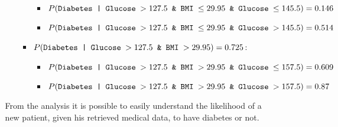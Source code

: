 \documentclass[12pt]{article}
\begin{document}
\begin{enumerate}[leftmargin=\labelsep, label=\textbf{\arabic*.)}]
\begin{enumerate}[label=\textbf{\roman*.)},leftmargin=0em]
\begin{itemize}
\begin{itemize}
                                        \begin{itemize}
                                            \item $P( \text{\texttt{Diabetes | Glucose $> 127.5$ \& BMI $\leq 29.95$ \& Glucose $\leq 145.5$}}) = 0.146$
                                            \item $P( \text{\texttt{Diabetes | Glucose $> 127.5$ \& BMI $\leq 29.95$ \& Glucose $> 145.5$}}) = 0.514$
                                        \end{itemize}
                                  \item $P( \text{\texttt{Diabetes | Glucose $> 127.5$ \& BMI $> 29.95$}}) = 0.725$:
                                        \begin{itemize}
                                            \item $P( \text{\texttt{Diabetes | Glucose $> 127.5$ \& BMI $> 29.95$ \& Glucose $\leq 157.5$}}) = 0.609$
                                            \item $P( \text{\texttt{Diabetes | Glucose $> 127.5$ \& BMI $> 29.95$ \& Glucose $> 157.5$}}) = 0.87$
                                        \end{itemize}
                              \end{itemize}
                    \end{itemize}

                    From the analysis it is possible to easily understand the likelihood of a new patient, given his retrieved medical data, to have diabetes or not.

          \end{enumerate}
\end{enumerate}
\end{document}
